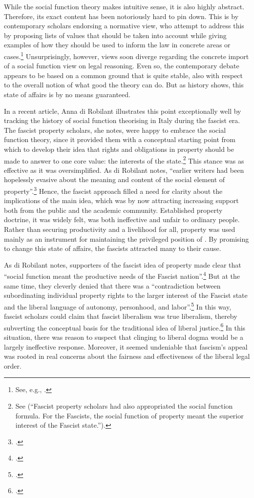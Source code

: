 While the social function theory makes intuitive sense, it is also highly abstract. Therefore, its exact content has been notoriously hard to pin down. This is  by contemporary scholars endorsing a normative view, who attempt to address this by proposing lists of values that should be taken into account while giving examples of how they should be used to inform the law in concrete areas or cases.\footnote{See, e.g., \cite{alexander14,alexander11,dagan07}.} Unsurprisingly, however, views soon diverge regarding the concrete import of a social function view on legal reasoning. Even so, the contemporary debate appears to be based on a common ground that is quite stable, also with respect to the overall notion of what good the theory can do. But as history shows, this state of affairs is by no means guaranteed. 

In a recent article, Anna di Robilant illustrates this point exceptionally well by tracking the history of social function theorising in Italy during the fascist era. The fascist property scholars, she notes, were happy to embrace the social function theory, since it provided them with a conceptual starting point from which to develop their idea that rights and obligations in property should be made to answer to one core value: the interests of the state.\footnote{See \cite[908-909]{robilant13} (``Fascist property scholars had also appropriated the social function formula. For the Fascists, the social function of property meant the superior interest of the Fascist state.'').} This stance was as effective as it was oversimplified. As di Robilant notes, ``earlier writers had been hopelessly evasive about the meaning and content of the social element of property''.\footcite[909]{robilant13} Hence, the fascist approach filled a need for clarity about the implications of the main idea, which was by now attracting increasing support both from the public and the academic community. Established property doctrine, it was widely felt, was both ineffective and unfair to ordinary people. Rather than securing productivity and a livelihood for all, property was used mainly as an instrument for maintaining the privileged position of . By promising to change this state of affairs, the fascists attracted many to their cause.

As di Robilant notes, supporters of the fascist idea of property made clear that ``social function meant the productive needs of the Fascist nation''.\footcite[909]{robilant13} But at the same time, they cleverly denied that there was a ``contradiction between subordinating individual property rights to the larger interest of the Fascist state and the liberal language of autonomy, personhood, and labor''.\footcite[900]{robilant13} In this way, fascist scholars could claim that fascist liberalism was true liberalism, thereby subverting the conceptual basis for the traditional idea of liberal justice.\footcite[900]{robilant13} In this situation, there was reason to suspect that clinging to liberal dogma would be a largely ineffective response. Moreover, it seemed undeniable that fascism's appeal was rooted in real concerns about the fairness and effectiveness of the liberal legal order. 


